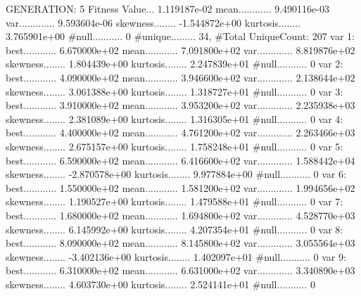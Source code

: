 \documentclass[oneside,letterpaper,titlepage]{article}
\begin{document}
\begin{Schunk}
\begin{Soutput}
GENERATION: 5
Fitness Value... 1.119187e-02
mean............ 9.490116e-03
var............. 9.593604e-06
skewness........ -1.544872e+00
kurtosis........ 3.765901e+00
#null........... 0
#unique......... 34, #Total UniqueCount: 207
var 1:
best............ 6.670000e+02
mean............ 7.091800e+02
var............. 8.819876e+02
skewness........ 1.804439e+00
kurtosis........ 2.247839e+01
#null........... 0
var 2:
best............ 4.090000e+02
mean............ 3.946600e+02
var............. 2.138644e+02
skewness........ 3.061388e+00
kurtosis........ 1.318727e+01
#null........... 0
var 3:
best............ 3.910000e+02
mean............ 3.953200e+02
var............. 2.235938e+03
skewness........ 2.381089e+00
kurtosis........ 1.316305e+01
#null........... 0
var 4:
best............ 4.400000e+02
mean............ 4.761200e+02
var............. 2.263466e+03
skewness........ 2.675157e+00
kurtosis........ 1.758248e+01
#null........... 0
var 5:
best............ 6.590000e+02
mean............ 6.416600e+02
var............. 1.588442e+04
skewness........ -2.870578e+00
kurtosis........ 9.977884e+00
#null........... 0
var 6:
best............ 1.550000e+02
mean............ 1.581200e+02
var............. 1.994656e+02
skewness........ 1.190527e+00
kurtosis........ 1.479588e+01
#null........... 0
var 7:
best............ 1.680000e+02
mean............ 1.694800e+02
var............. 4.528770e+03
skewness........ 6.145992e+00
kurtosis........ 4.207354e+01
#null........... 0
var 8:
best............ 8.090000e+02
mean............ 8.145800e+02
var............. 3.055564e+03
skewness........ -3.402136e+00
kurtosis........ 1.402097e+01
#null........... 0
var 9:
best............ 6.310000e+02
mean............ 6.631000e+02
var............. 3.340890e+03
skewness........ 4.603730e+00
kurtosis........ 2.524141e+01
#null........... 0


\end{Soutput}
\end{Schunk}
\end{document}
